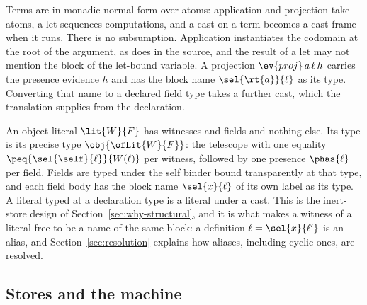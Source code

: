 Terms are in monadic normal form over atoms: application and projection take atoms, a let sequences computations, and a cast on a term becomes a cast frame when it runs. There is no subsumption. Application instantiates the codomain at the root of the argument, as  does in the source, and the result of a let may not mention the block of the let-bound variable. A projection $\ev{proj}\,a\,\ell\,h$ carries the presence evidence $h$ and has the block name $\sel{\rt{a}}{\ell}$ as its type. Converting that name to a declared field type takes a further cast, which the translation supplies from the declaration.

An object literal $\lit{W}{F}$ has witnesses and fields and nothing else. Its type is its precise type $\obj{\ofLit{W}{F}}$: the telescope with one equality $\peq{\sel{\self}{\ell}}{W(\ell)}$ per witness, followed by one presence $\phas{\ell}$ per field. Fields are typed under the self binder bound transparently at that type, and each field body has the block name $\sel{x}{\ell}$ of its own label as its type. A literal typed at a declaration type is a literal under a cast. This is the inert-store design of Section~\ref{sec:why-structural}, and it is what makes a witness of a literal free to be a name of the same block: a definition $\ell = \sel{x}{\ell'}$ is an alias, and Section~\ref{sec:resolution} explains how aliases, including cyclic ones, are resolved.

\subsection{Stores and the machine}

